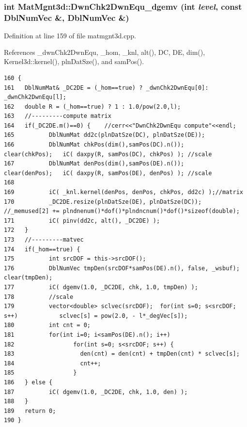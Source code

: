 \subsubsection{\setlength{\rightskip}{0pt plus 5cm}int Mat\-Mgnt3d::Dwn\-Chk2Dwn\-Equ\_\-dgemv (int {\em level}, const Dbl\-Num\-Vec \&, Dbl\-Num\-Vec \&)}\label{classMatMgnt3d_b3f2a5306c0edee2c9df2722feb84c6c_b3f2a5306c0edee2c9df2722feb84c6c}




Definition at line 159 of file matmgnt3d.cpp.

References \_\-dwn\-Chk2Dwn\-Equ, \_\-hom, \_\-knl, alt(), DC, DE, dim(), Kernel3d::kernel(), pln\-Dat\-Sze(), and sam\-Pos().

\footnotesize\begin{verbatim}160 {
161   DblNumMat& _DC2DE = (_hom==true) ? _dwnChk2DwnEqu[0]: _dwnChk2DwnEqu[l];
162   double R = (_hom==true) ? 1 : 1.0/pow(2.0,l);
163   //---------compute matrix
164   if(_DC2DE.m()==0) {    //cerr<<"DwnChk2DwnEqu compute"<<endl;
165          DblNumMat dd2c(plnDatSze(DC), plnDatSze(DE));
166          DblNumMat chkPos(dim(),samPos(DC).n());                clear(chkPos);   iC( daxpy(R, samPos(DC), chkPos) ); //scale
167          DblNumMat denPos(dim(),samPos(DE).n());                clear(denPos);   iC( daxpy(R, samPos(DE), denPos) ); //scale
168          
169          iC( _knl.kernel(denPos, denPos, chkPos, dd2c) );//matrix
170          _DC2DE.resize(plnDatSze(DE), plnDatSze(DC)); //_memused[2] += plndnenum()*dof()*plndncnum()*dof()*sizeof(double);
171          iC( pinv(dd2c, alt(), _DC2DE) );
172   }
173   //---------matvec
174   if(_hom==true) {
175          int srcDOF = this->srcDOF();
176          DblNumVec tmpDen(srcDOF*samPos(DE).n(), false, _wsbuf);         clear(tmpDen);
177          iC( dgemv(1.0, _DC2DE, chk, 1.0, tmpDen) );
178          //scale
179          vector<double> sclvec(srcDOF);  for(int s=0; s<srcDOF; s++)            sclvec[s] = pow(2.0, - l*_degVec[s]);
180          int cnt = 0;
181          for(int i=0; i<samPos(DE).n(); i++)
182                 for(int s=0; s<srcDOF; s++) {
183                   den(cnt) = den(cnt) + tmpDen(cnt) * sclvec[s];
184                   cnt++;
185                 }
186   } else {
187          iC( dgemv(1.0, _DC2DE, chk, 1.0, den) );
188   }
189   return 0;
190 }
\end{verbatim}\normalsize 


